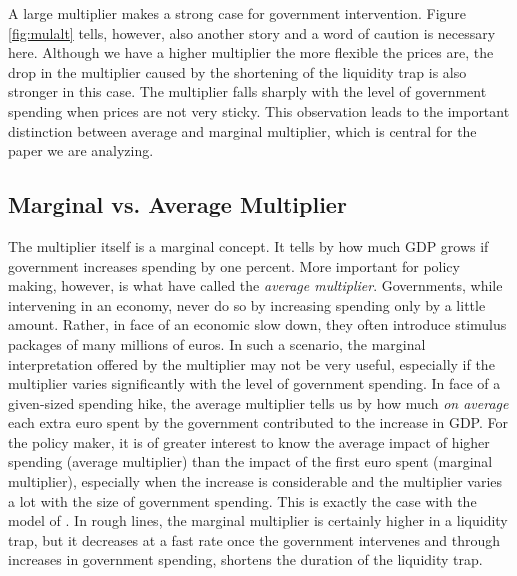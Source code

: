 A large multiplier makes a strong case for government intervention. Figure \ref{fig:mulalt} tells, however, also another story and a word of caution is necessary here. Although we have a higher multiplier the more flexible the prices are, the drop in the multiplier caused by the shortening of the liquidity trap is also stronger in this case. The multiplier falls sharply with the level of government spending when prices are not very sticky. This observation leads to the important distinction between average and marginal multiplier, which is central for the paper we are analyzing.


\subsection*{Marginal vs. Average Multiplier}

The multiplier itself is a marginal concept. It tells by how much GDP grows if government increases spending by one percent. More important for policy making, however, is what \citet{Erceg.2014} have called the \textit{average multiplier}. Governments, while intervening in an economy, never do so by increasing spending only by a little amount. Rather, in face of an economic slow down, they often introduce stimulus packages of many millions of euros. In such a scenario, the marginal interpretation offered by the multiplier may not be very useful, especially if the multiplier varies significantly with the level of government spending. In face of a given-sized spending hike, the average multiplier tells us by how much \textit{on average} each extra euro spent by the government contributed to the increase in GDP. For the policy maker, it is of greater interest to know the average impact of higher spending (average multiplier) than the impact of the first euro spent (marginal multiplier), especially when the increase is considerable and the multiplier varies a lot with the size of government spending. This is exactly the case with the model of \citet{Erceg.2014}. In rough lines, the marginal multiplier is certainly higher in a liquidity trap, but it decreases at a fast rate once the government intervenes and through increases in government spending, shortens the duration of the liquidity trap.




